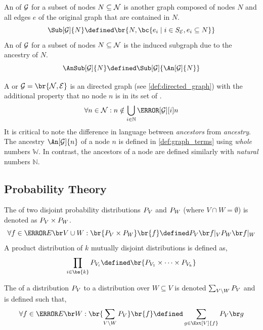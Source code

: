 \documentclass[aps, 10pt, english, twoside, pra, nofootinbib, longbibliography]{revtex4-1}
\begin{document}
    \begin{definition}
        An  of $\mathcal{G}$ for a subset of nodes $N \subseteq \mathcal{N}$ is another graph composed of nodes $N$ and all edges $e$ of the original graph that are contained in $N$.
        \[ \Sub[\graph]{N} \defined \br{N, \bc{e_i \mid i \in \ind_\edges, e_i \subseteq N}} \]
        An  of $\mathcal{G}$ for a subset of nodes $N \subseteq \mathcal{N}$ is the induced subgraph due to the ancestry of $N$.
        \[ \AnSub[\graph]{N} \defined \Sub[\graph]{\An[\graph]{N}} \]
    \end{definition}

    \begin{definition}
        \label{def:dag}
        A  or  $\graph = \br{\nodes, \edges}$ is an directed graph (see \cref{def:directed_graph}) with the additional property that no node $n$ is in its set of .
        \[ \forall n \in \nodes : n \notin \bigcup_{i\in\mathbb{N}} \Pa[\graph][i]{n}\]
        It is critical to note the difference in language between \textit{ancestors} from \textit{ancestry}. The ancestry $\An[\graph]{n}$ of a node $n$ is defined in \cref{def:graph_terms} using \textit{whole} numbers $\mathbb{W}$. In contrast, the ancestors of a node are defined similarly with \textit{natural} numbers $\mathbb{N}$.
    \end{definition}

    \subsection{Probability Theory}

    \begin{definition}
        The  of two disjoint probability distributions $\prob[V]$ and $\prob[W]$ (where $V \cap W = \emptyset$) is denoted as $\prob[V] \times \prob[W]$.
        \[ \forall f \in \Events{V \cup W} : \br{\prob[V] \times \prob[W]}\br{f} \defined \prob[V][f|_{V}]\tcdot\prob[W][f|_{W}] \]
        A product distribution of $k$ mutually disjoint distributions is defined as,
        \[ \prod_{i\in\bs{k}} \prob[V_i] \defined \br{\prob[V_1] \times \cdots \times \prob[V_k]} \]
    \end{definition}

    \begin{definition}
        The  of a distribution $\prob[V]$ to a distribution over $W \subseteq V$ is denoted $\sum_{V \setminus W} \prob[V]$ and is defined such that,
        \[ \forall f \in \Events{W} : \br{\sum_{V \setminus W} \prob[V]}\br{f} \defined \sum_{g \in \Ext[V]{f}} \prob[V][g] \]
    \end{definition}
\end{document}
